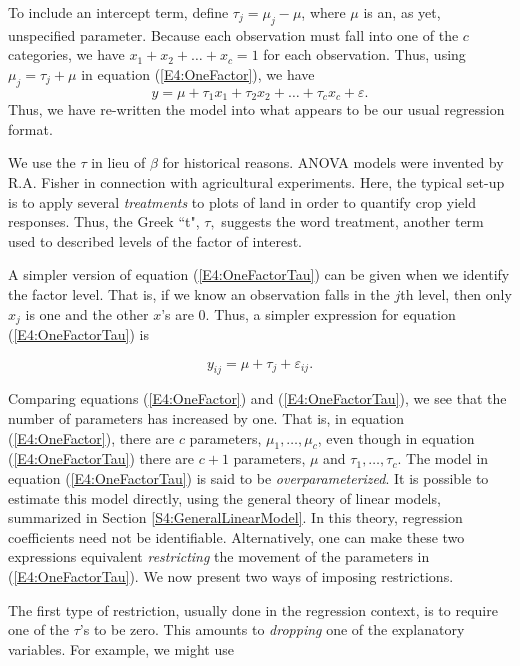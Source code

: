 To include an intercept term, define $\tau_j = \mu_j - \mu $, where
$\mu$ is an, as yet, unspecified parameter. Because each observation
must fall into one of the $c$ categories, we have $x_1+x_2+\ldots
+x_{c}=1$ for each observation. Thus, using $\mu _j = \tau_j + \mu $
in equation (\ref{E4:OneFactor}), we have
\begin{equation}\label{E4:OneFactorTau}
y=\mu +\tau_1x_1+\tau_2x_2+\ldots +\tau_{c}x_{c}+\varepsilon.
\end{equation}
Thus, we have re-written the model into what appears to be our usual
regression format.

We use the $\tau $ in lieu of $\beta $ for historical reasons. ANOVA
models were invented by R.A. Fisher in connection with agricultural
experiments. Here, the typical set-up is to apply several
\textit{treatments} to plots of land in order to quantify crop yield
responses. Thus, the Greek ``t", $\tau ,$ suggests the word
treatment, another term used to described levels of the factor of
interest.

A simpler version of equation (\ref{E4:OneFactorTau}) can be given
when we identify the factor level. That is, if we know an
observation falls in the $j$th level, then only $x_j$ is one and the
other $x$'s are 0. Thus, a simpler expression for equation
(\ref{E4:OneFactorTau}) is

\begin{equation*}
y_{ij}=\mu +\tau_j + \varepsilon_{ij}.
\end{equation*}

Comparing equations (\ref{E4:OneFactor}) and
(\ref{E4:OneFactorTau}), we see that the number of parameters
has increased by one. That is, in equation (\ref{E4:OneFactor}), there are $c$ parameters, $%
\mu_1,\ldots ,\mu_c$, even though in equation
(\ref{E4:OneFactorTau}) there are $c+1$ parameters, $\mu $ and $\tau
_1,\ldots ,\tau_c$. The model in equation (\ref{E4:OneFactorTau}) is
said to be \textit{overparameterized}. It is possible to estimate
this model directly, using the general theory of linear models,
summarized in Section \ref{S4:GeneralLinearModel}. In this theory,
regression coefficients need not be identifiable. Alternatively, one
can make these two expressions equivalent \textit{restricting} the
movement of the parameters in (\ref{E4:OneFactorTau}). We now
present two ways of imposing restrictions.

The first type of restriction, usually done in the regression context, is to
require one of the $\tau $'s to be zero. This amounts to \textit{dropping}
one of the explanatory variables. For example, we might use

